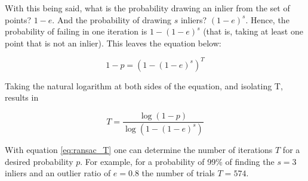 \documentclass[../main.tex]{subfiles}
\begin{document}
With this being said, what is the probability drawing an inlier from the set of points? $1-e$. And the probability of drawing $s$ inliers? $\left(1-e\right)^{s}$. Hence, the probability of failing in one iteration is $1-\left(1-e\right)^{s}$ (that is, taking at least one point that is not an inlier). This leaves the equation below:

\begin{equation}
    1-p=\left(1-(1-e)^{s}\right)^{T}
\end{equation}

Taking the natural logarithm at both sides of the equation, and isolating T, results in

\begin{equation} \label{eq:ransac_T}
    T=\frac{\log (1-p)}{\log \left(1-(1-e)^{s}\right)}
\end{equation}

With equation \ref{eq:ransac_T} one can determine the number of iterations $T$ for a desired probability $p$. For example, for a probability of 99\% of finding the $s=3$ inliers and an outlier ratio of $e=0.8$ the number of trials $T=574$.
\end{document}
